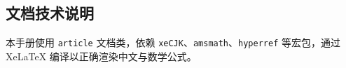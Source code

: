 \documentclass[12pt,a4paper]{article}
\begin{document}
\subsection{文档技术说明}

本手册使用 \texttt{article} 文档类，依赖 \texttt{xeCJK}、\texttt{amsmath}、\texttt{hyperref} 等宏包，通过 XeLaTeX 编译以正确渲染中文与数学公式。
\end{document}
